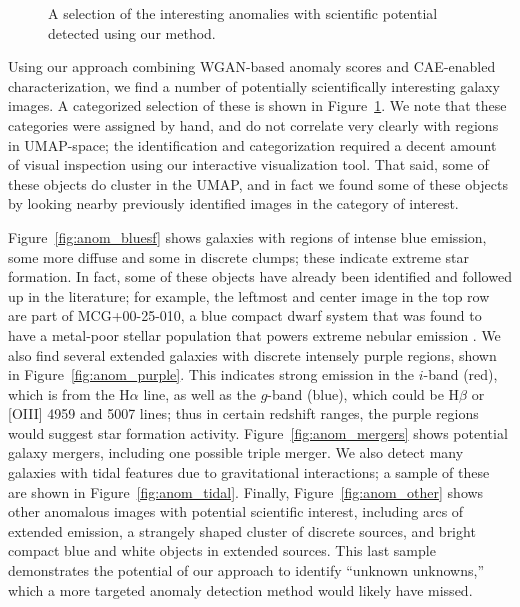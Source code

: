 \begin{figure}

  \vspace{0cm}

  \caption{A selection of the interesting anomalies with scientific potential detected using our method.}
  \label{fig:anomalies}
\end{figure}

Using our approach combining WGAN-based anomaly scores and CAE-enabled characterization, we find a number of potentially scientifically interesting galaxy images.
A categorized selection of these is shown in Figure~\ref{fig:anomalies}.
We note that these categories were assigned by hand, and do not correlate very clearly with regions in UMAP-space; the identification and categorization required a decent amount of visual inspection using our interactive visualization tool.
That said, some of these objects do cluster in the UMAP, and in fact we found some of these objects by looking nearby previously identified images in the category of interest.

Figure~\ref{fig:anom_bluesf} shows galaxies with regions of intense blue emission, some more diffuse and some in discrete clumps; these indicate extreme star formation.
In fact, some of these objects have already been identified and followed up in the literature; for example, the leftmost and center image in the top row are part of MCG+00-25-010, a blue compact dwarf system that was found to have a metal-poor stellar population that powers extreme nebular emission \citep{Senchyna2017}.
We also find several extended galaxies with discrete intensely purple regions, shown in Figure~\ref{fig:anom_purple}.
This indicates strong emission in the $i$-band (red), which is from the H$\alpha$ line, as well as the $g$-band (blue), which could be H$\beta$ or [OIII] 4959 and 5007 lines; thus in certain redshift ranges, the purple regions would suggest star formation activity.
Figure~\ref{fig:anom_mergers} shows potential galaxy mergers, including one possible triple merger. 
We also detect many galaxies with tidal features due to gravitational interactions; a sample of these are shown in Figure~\ref{fig:anom_tidal}.
Finally, Figure~\ref{fig:anom_other} shows other anomalous images with potential scientific interest, including arcs of extended emission, a strangely shaped cluster of discrete sources, and bright compact blue and white objects in extended sources.
This last sample demonstrates the potential of our approach to identify ``unknown unknowns,'' which a more targeted anomaly detection method would likely have missed.

